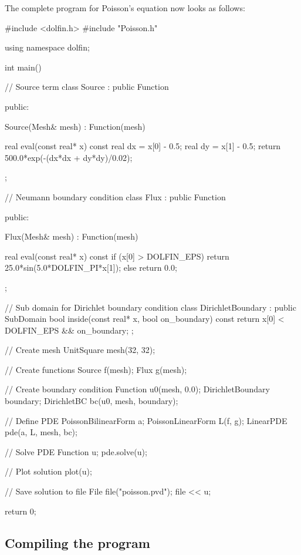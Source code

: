 The complete program for Poisson's equation now looks as follows:
\small
\begin{code}

#include <dolfin.h>
#include "Poisson.h"
  
using namespace dolfin;

int main()
{
  // Source term
  class Source : public Function
  {
  public:
    
    Source(Mesh& mesh) : Function(mesh) {}

    real eval(const real* x) const
    {
      real dx = x[0] - 0.5;
      real dy = x[1] - 0.5;
      return 500.0*exp(-(dx*dx + dy*dy)/0.02);
    }

  };

  // Neumann boundary condition
  class Flux : public Function
  {
  public:

    Flux(Mesh& mesh) : Function(mesh) {}

    real eval(const real* x) const
    {
      if (x[0] > DOLFIN_EPS)
        return 25.0*sin(5.0*DOLFIN_PI*x[1]);
      else
        return 0.0;
    }

  };

  // Sub domain for Dirichlet boundary condition
  class DirichletBoundary : public SubDomain
  {
    bool inside(const real* x, bool on_boundary) const
    {
      return x[0] < DOLFIN_EPS && on_boundary;
    }
  };

  // Create mesh
  UnitSquare mesh(32, 32);

  // Create functions
  Source f(mesh);
  Flux g(mesh);

  // Create boundary condition
  Function u0(mesh, 0.0);
  DirichletBoundary boundary;
  DirichletBC bc(u0, mesh, boundary);
  
  // Define PDE
  PoissonBilinearForm a;
  PoissonLinearForm L(f, g);
  LinearPDE pde(a, L, mesh, bc);

  // Solve PDE
  Function u;
  pde.solve(u);

  // Plot solution
  plot(u);

  // Save solution to file
  File file("poisson.pvd");
  file << u;

  return 0;
}
\end{code}
\normalsize

\subsection{Compiling the program}

